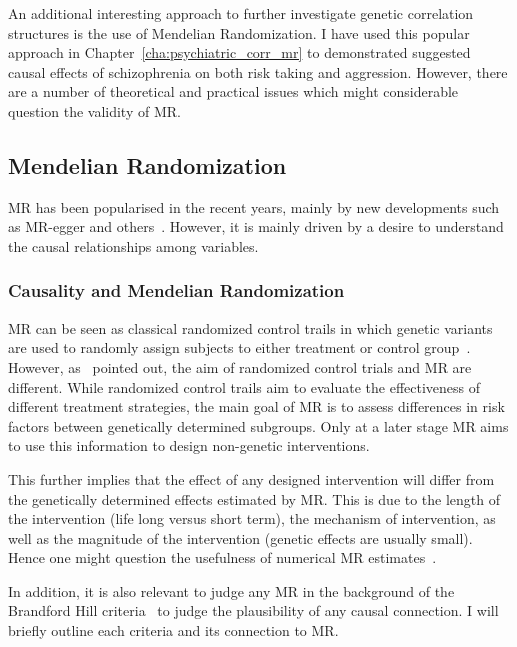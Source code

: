 An additional interesting approach to further investigate genetic correlation structures is the use of Mendelian Randomization.
I have used this popular approach in Chapter~\ref{cha:psychiatric_corr_mr} to demonstrated suggested causal effects of schizophrenia on both risk taking and aggression.
However, there are a number of theoretical and practical issues which might considerable question the validity of MR\@.

\subsection{Mendelian Randomization}
\label{sub:mendelian_randomization_discussion}

MR has been popularised in the recent years, mainly by new developments such as MR-egger and others~\cite{Bowden2015}.
However, it is mainly driven by a desire to understand the causal relationships among variables.

\subsubsection{Causality and Mendelian Randomization}
\label{ssub:causality_and_mendelian_randomization}

MR can be seen as classical randomized control trails in which genetic variants are used to randomly assign subjects to either treatment or control group~\cite{Hingorani2005}.
However, as~\citet{Burgess2016a} pointed out, the aim of randomized control trials and MR are different.
While randomized control trails aim to evaluate the effectiveness of different treatment strategies, the main goal of MR is to assess differences in risk factors between genetically determined subgroups.   
Only at a later stage MR aims to use this information to design non-genetic interventions.

This further implies that the effect of any designed intervention will differ from the genetically determined effects estimated by MR\@.
This is due to the length of the intervention (life long versus short term), the mechanism of intervention, as well as the magnitude of the intervention (genetic effects are usually small). 
Hence one might question the usefulness of numerical MR estimates~\cite{Vanderweele2015}.

In addition, it is also relevant to judge any MR in the background of the Brandford Hill criteria~\cite{Hill1965} to judge the plausibility of any causal connection.
I will briefly outline each criteria and its connection to MR\@.

